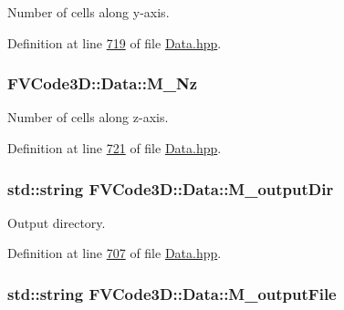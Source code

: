 Number of cells along y-\/axis. 



Definition at line \hyperlink{Data_8hpp_source_l00719}{719} of file \hyperlink{Data_8hpp_source}{Data.\+hpp}.

\subsubsection[{\texorpdfstring{M\+\_\+\+Nz}{M_Nz}}]{ F\+V\+Code3\+D\+::\+Data\+::\+M\+\_\+\+Nz\hspace{0.3cm}{\ttfamily [protected]}}\hypertarget{classFVCode3D_1_1Data_a7f877632f0740bbedf5ce5e05d6d1add}{}\label{classFVCode3D_1_1Data_a7f877632f0740bbedf5ce5e05d6d1add}


Number of cells along z-\/axis. 



Definition at line \hyperlink{Data_8hpp_source_l00721}{721} of file \hyperlink{Data_8hpp_source}{Data.\+hpp}.

\subsubsection[{\texorpdfstring{M\+\_\+output\+Dir}{M_outputDir}}]{\setlength{\rightskip}{0pt plus 5cm}std\+::string F\+V\+Code3\+D\+::\+Data\+::\+M\+\_\+output\+Dir\hspace{0.3cm}{\ttfamily [protected]}}\hypertarget{classFVCode3D_1_1Data_af5685db93f1e6c697fa63241351d1bcd}{}\label{classFVCode3D_1_1Data_af5685db93f1e6c697fa63241351d1bcd}


Output directory. 



Definition at line \hyperlink{Data_8hpp_source_l00707}{707} of file \hyperlink{Data_8hpp_source}{Data.\+hpp}.

\subsubsection[{\texorpdfstring{M\+\_\+output\+File}{M_outputFile}}]{\setlength{\rightskip}{0pt plus 5cm}std\+::string F\+V\+Code3\+D\+::\+Data\+::\+M\+\_\+output\+File\hspace{0.3cm}{\ttfamily [protected]}}\hypertarget{classFVCode3D_1_1Data_a34713b7f3fd7176b0745f902713722dd}{}\label{classFVCode3D_1_1Data_a34713b7f3fd7176b0745f902713722dd}


